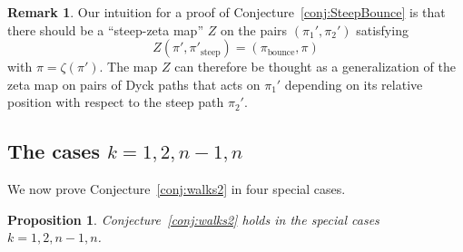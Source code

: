 \documentclass{amsart}
\newtheorem{proposition}[theorem]{Proposition}
\theoremstyle{definition}
\newtheorem{remark}[theorem]{Remark}
\newcommand{\bounce}{\operatorname{bounce}} %
\newcommand{\steep}{\operatorname{steep}} %
\begin{document}
\begin{remark}
\label{rem_step_zeta_map}
Our intuition for a proof of Conjecture~\ref{conj:SteepBounce} is that there should be a ``steep-zeta map'' $Z$ on the pairs $(\pi_1',\pi_2')$ satisfying 
\[
Z(\pi',\pi'_{\steep}) = (\pi_{\bounce},\pi)
\]
with $\pi=\zeta(\pi')$. The map $Z$ can therefore be thought as a generalization of the zeta map on pairs of Dyck paths that acts on $\pi_1'$ depending on its relative position with respect to the steep path $\pi_2'$.
\end{remark}


\subsection{The cases $k=1,2,n-1,n$}

We now prove Conjecture~\ref{conj:walks2} in four special cases.

\begin{proposition}
Conjecture~\ref{conj:walks2} holds in the special cases $k=1,2, n-1,n$.
\end{proposition}
\end{document}
